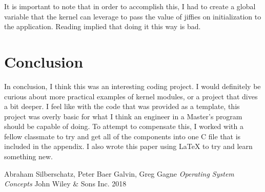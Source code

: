 \documentclass[10pt]{article}
\begin{document}
It is important to note that in order to accomplish this, I had to create a global variable that the kernel can leverage to pass the value of jiffies on initialization to the application.  Reading implied that doing it this way is bad.

\section{Conclusion}
In conclusion, I think this was an interesting coding project.  I would definitely be curious about more practical examples of kernel modules, or a project that dives a bit deeper.  I feel like with the code that was provided as a template, this project was overly basic for what I think an engineer in a Master's program should be capable of doing.  To attempt to compensate this, I worked with a fellow classmate to try and get all of the components into one C file that is included in the appendix.  I also wrote this paper using LaTeX to try and learn something new.

\pagebreak
\begin{thebibliography}{9}
Abraham Silberschatz, Peter Baer Galvin, Greg Gagne
\textit{Operating System Concepts}
John Wiley \& Sons Inc. 2018
\end{thebibliography}

\pagebreak
\end{document}
